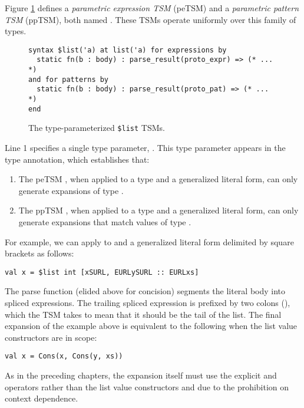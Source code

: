 Figure \ref{fig:petsm-list} defines a \emph{parametric expression TSM} (peTSM) and a \emph{parametric pattern TSM} (ppTSM), both named . These TSMs operate uniformly over this family of types.
\begin{figure}[h]
\begin{lstlisting}
syntax $list('a) at list('a) for expressions by 
  static fn(b : body) : parse_result(proto_expr) => (* ... *)
and for patterns by 
  static fn(b : body) : parse_result(proto_pat) => (* ... *) 
end
\end{lstlisting}
\caption{The type-parameterized \texttt{\$list} TSMs.}
\label{fig:petsm-list}
\end{figure}

Line 1 specifies a single type parameter, . This type parameter appears in the type annotation, which establishes that:
\begin{enumerate}
\item The peTSM , when applied to a type  and a generalized literal form, can only generate expansions of type .
\item The ppTSM , when applied to a type  and a generalized literal form, can only generate expansions that match values of type .
\end{enumerate}
For example, we can apply  to  and a generalized literal form delimited by square brackets as follows:
\begin{lstlisting}[numbers=none]
val x = $list int [xSURL, EURLySURL :: EURLxs]
\end{lstlisting}
The parse function (elided above for concision) segments the literal body into  spliced expressions. The trailing spliced expression is prefixed by two colons (), which the TSM takes to mean that it should be the tail of the list. The final expansion of the example above is equivalent to the following when the list value constructors are in scope:
\begin{lstlisting}[numbers=none]
val x = Cons(x, Cons(y, xs))
\end{lstlisting}
As in the preceding chapters, the expansion itself must use the explicit  and  operators rather than the list value constructors  and  due to the prohibition on context dependence.

